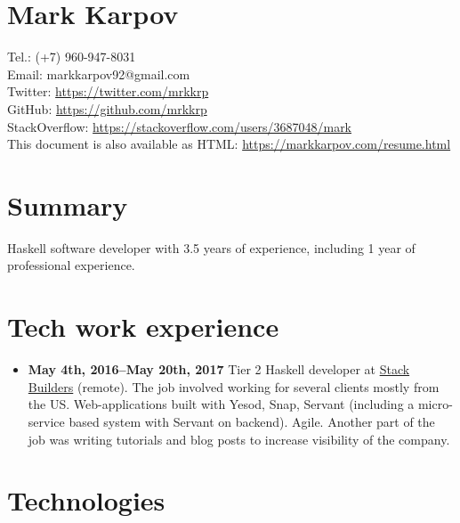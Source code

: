 \documentclass[a4paper,12pt]{article}
\begin{document}

\section*{Mark Karpov}

Tel.: (+7) 960-947-8031\\
Email: markkarpov92@gmail.com\\
Twitter: \href{https://twitter.com/mrkkrp}{https://twitter.com/mrkkrp}\\
GitHub: \href{https://github.com/mrkkrp}{https://github.com/mrkkrp}\\
StackOverflow: \href{https://stackoverflow.com/users/3687048/mark}{https://stackoverflow.com/users/3687048/mark}\\
This document is also available as HTML: \href{https://markkarpov.com/resume.html}{https://markkarpov.com/resume.html}

\sectionfont{\fontsize{12}{15}\selectfont\sectionrule{0pt}{0pt}{-5pt}{0.8pt}}

\section*{Summary}

Haskell software developer with 3.5 years of experience, including 1 year of
professional experience.

\section*{Tech work experience}

\begin{itemize}[noitemsep]
\item \textbf{May 4th, 2016--May 20th, 2017} Tier 2 Haskell developer at
  \href{https://www.stackbuilders.com/}{Stack Builders} (remote). The job
  involved working for several clients mostly from the US. Web-applications
  built with Yesod, Snap, Servant (including a micro-service based system
  with Servant on backend). Agile. Another part of the job was writing
  tutorials and blog posts to increase visibility of the company.
\end{itemize}

\section*{Technologies}
\end{document}
